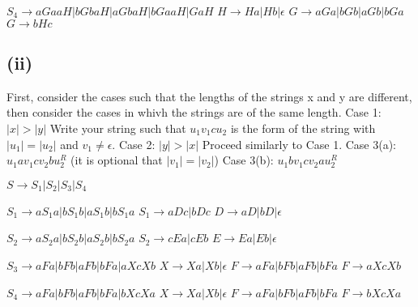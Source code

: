 \documentclass[12pt]{article}
\begin{document}
$S_4 \rightarrow aGaaH|bGbaH|aGbaH|bGaaH|GaH$ \newline
$H \rightarrow Ha|Hb|\epsilon$ \newline
$G \rightarrow aGa|bGb|aGb|bGa$ \newline
$G \rightarrow bHc$ \newline


\subsection*{(ii)}

First, consider the cases such that the lengths of the strings x and y are different, then consider the cases in whivh the strings are of the same length. \newline
Case 1: $|x| > |y|$ Write your string such that $u_1v_1cu_2$ is the form of the string with $|u_1|=|u_2|$ and $v_1 \neq \epsilon$. \newline
Case 2: $|y| > |x|$ Proceed similarly to Case 1. \newline
Case 3(a): $u_1av_1cv_2bu_2^R$ (it is optional that $|v_1|=|v_2|$) \newline
Case 3(b): $u_1bv_1cv_2au_2^R$

\medskip

$S \rightarrow S_1|S_2|S_3|S_4$ \newline

$S_1 \rightarrow aS_1a|bS_1b|aS_1b|bS_1a$ \newline
$S_1 \rightarrow aDc|bDc$ \newline
$D \rightarrow aD|bD| \epsilon$ \newline

$S_2 \rightarrow aS_2a|bS_2b|aS_2b|bS_2a$ \newline
$S_2 \rightarrow cEa|cEb$ \newline
$E \rightarrow Ea|Eb| \epsilon$ \newline

$S_3 \rightarrow aFa|bFb|aFb|bFa|aXcXb$ \newline
$X \rightarrow Xa|Xb|\epsilon$ \newline
$F \rightarrow aFa|bFb|aFb|bFa$ \newline
$F \rightarrow aXcXb$ \newline

$S_4 \rightarrow aFa|bFb|aFb|bFa|bXcXa$ \newline
$X \rightarrow Xa|Xb|\epsilon$ \newline
$F \rightarrow aFa|bFb|aFb|bFa$ \newline
$F \rightarrow bXcXa$ \newline
\end{document}
